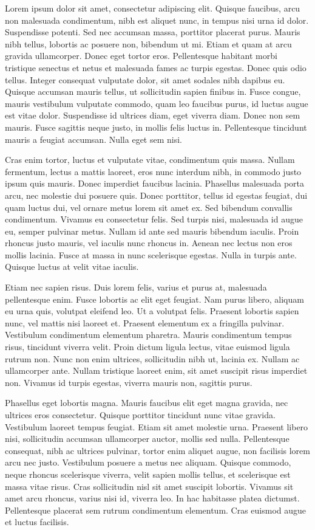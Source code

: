 \documentclass{modelica}
\begin{document}
Lorem ipsum dolor sit amet, consectetur adipiscing elit. Quisque faucibus, arcu non malesuada condimentum, nibh est aliquet nunc, in tempus nisi urna id dolor. Suspendisse potenti. Sed nec accumsan massa, porttitor placerat purus. Mauris nibh tellus, lobortis ac posuere non, bibendum ut mi. Etiam et quam at arcu gravida ullamcorper. Donec eget tortor eros. Pellentesque habitant morbi tristique senectus et netus et malesuada fames ac turpis egestas. Donec quis odio tellus. Integer consequat vulputate dolor, sit amet sodales nibh dapibus eu. Quisque accumsan mauris tellus, ut sollicitudin sapien finibus in. Fusce congue, mauris vestibulum vulputate commodo, quam leo faucibus purus, id luctus augue est vitae dolor. Suspendisse id ultrices diam, eget viverra diam. Donec non sem mauris. Fusce sagittis neque justo, in mollis felis luctus in. Pellentesque tincidunt mauris a feugiat accumsan. Nulla eget sem nisi.

Cras enim tortor, luctus et vulputate vitae, condimentum quis massa. Nullam fermentum, lectus a mattis laoreet, eros nunc interdum nibh, in commodo justo ipsum quis mauris. Donec imperdiet faucibus lacinia. Phasellus malesuada porta arcu, nec molestie dui posuere quis. Donec porttitor, tellus id egestas feugiat, dui quam luctus dui, vel ornare metus lorem sit amet ex. Sed bibendum convallis condimentum. Vivamus eu consectetur felis. Sed turpis nisi, malesuada id augue eu, semper pulvinar metus. Nullam id ante sed mauris bibendum iaculis. Proin rhoncus justo mauris, vel iaculis nunc rhoncus in. Aenean nec lectus non eros mollis lacinia. Fusce at massa in nunc scelerisque egestas. Nulla in turpis ante. Quisque luctus at velit vitae iaculis.

Etiam nec sapien risus. Duis lorem felis, varius et purus at, malesuada pellentesque enim. Fusce lobortis ac elit eget feugiat. Nam purus libero, aliquam eu urna quis, volutpat eleifend leo. Ut a volutpat felis. Praesent lobortis sapien nunc, vel mattis nisi laoreet et. Praesent elementum ex a fringilla pulvinar. Vestibulum condimentum elementum pharetra. Mauris condimentum tempus risus, tincidunt viverra velit. Proin dictum ligula lectus, vitae euismod ligula rutrum non. Nunc non enim ultrices, sollicitudin nibh ut, lacinia ex. Nullam ac ullamcorper ante. Nullam tristique laoreet enim, sit amet suscipit risus imperdiet non. Vivamus id turpis egestas, viverra mauris non, sagittis purus.

Phasellus eget lobortis magna. Mauris faucibus elit eget magna gravida, nec ultrices eros consectetur. Quisque porttitor tincidunt nunc vitae gravida. Vestibulum laoreet tempus feugiat. Etiam sit amet molestie urna. Praesent libero nisi, sollicitudin accumsan ullamcorper auctor, mollis sed nulla. Pellentesque consequat, nibh ac ultrices pulvinar, tortor enim aliquet augue, non facilisis lorem arcu nec justo. Vestibulum posuere a metus nec aliquam. Quisque commodo, neque rhoncus scelerisque viverra, velit sapien mollis tellus, et scelerisque est massa vitae risus. Cras sollicitudin nisl sit amet suscipit lobortis. Vivamus sit amet arcu rhoncus, varius nisi id, viverra leo. In hac habitasse platea dictumst. Pellentesque placerat sem rutrum condimentum elementum. Cras euismod augue et luctus facilisis.
\end{document}
